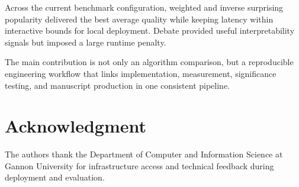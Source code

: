 \documentclass[conference]{IEEEtran}
\begin{document}
Across the current benchmark configuration, weighted and inverse surprising popularity delivered the best average quality while keeping latency within interactive bounds for local deployment. Debate provided useful interpretability signals but imposed a large runtime penalty.

The main contribution is not only an algorithm comparison, but a reproducible engineering workflow that links implementation, measurement, significance testing, and manuscript production in one consistent pipeline.

\section*{Acknowledgment}
The authors thank the Department of Computer and Information Science at Gannon University for infrastructure access and technical feedback during deployment and evaluation.

\balance
\footnotesize


\end{document}
